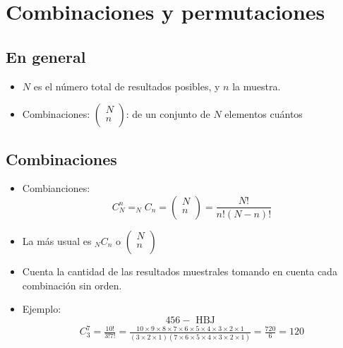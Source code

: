 \section{Combinaciones y permutaciones}
\subsection{En general}
\begin{itemize}
    \item $N$ es el número total de resultados posibles, y $n$ la muestra.
    \item Combinaciones: $\left(\begin{matrix} N \\ n \\ \end{matrix}\right)$: de un conjunto de $N$ elementos cuántos
\end{itemize}

\subsection{Combinaciones}
\begin{itemize}
    \item Combianciones:
        \[
          C_N^n = _NC_n = \left( \begin{matrix}
              N \\ 
              n \\ 
          \end{matrix} \right) = \frac{N!}{n!(N-n)!} 
        \]
    
    \item La más usual es $_NC_n$ o $\left(\begin{matrix}
        N \\ 
        n \\ 
    \end{matrix}\right)$ 

    
    \item Cuenta la cantidad de las resultados muestrales tomando en cuenta cada combinación sin orden.
    \item Ejemplo:
        \[
          456-\text{  HBJ  }
        \]
        \begin{align*}
            C_3^7 = \frac{10!}{3!7!} = \frac{10\times 9 \times 8 \times 7 \times 6 \times 5 \times 4 \times 3 \times 2 \times 1}{(3\times 2 \times  1 )(7 \times 6 \times 5 \times 4 \times 3 \times 2 \times 1)} = \frac{720}{6}  = 120 \\   
        \end{align*}
\end{itemize}


